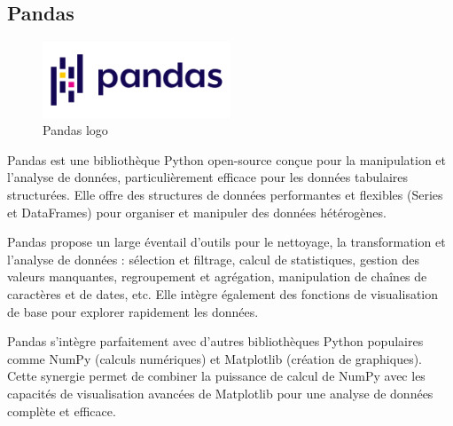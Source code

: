 \documentclass[a4paper,12pt]{report}
\numberwithin{equation}{section}
\begin{document}
\subsection{Pandas}
\vspace{1cm}
\begin{figure}[H]
    \centering
    \includegraphics[width=0.5\textwidth]{tech/pandas-logo.png}
    \caption{Pandas logo}
    \label{fig:Pandas logo}
\end{figure}
\vspace{1cm}
\par
Pandas est une bibliothèque Python open-source conçue pour la manipulation et l'analyse de données, particulièrement efficace pour les données tabulaires structurées. Elle offre des structures de données performantes et flexibles (Series et DataFrames) pour organiser et manipuler des données hétérogènes.
\\ \par
Pandas propose un large éventail d'outils pour le nettoyage, la transformation et l'analyse de données : sélection et filtrage, calcul de statistiques, gestion des valeurs manquantes, regroupement et agrégation, manipulation de chaînes de caractères et de dates, etc. Elle intègre également des fonctions de visualisation de base pour explorer rapidement les données.
\\ \par
Pandas s'intègre parfaitement avec d'autres bibliothèques Python populaires comme NumPy (calculs numériques) et Matplotlib (création de graphiques). Cette synergie permet de combiner la puissance de calcul de NumPy avec les capacités de visualisation avancées de Matplotlib pour une analyse de données complète et efficace.
\newpage
\end{document}
